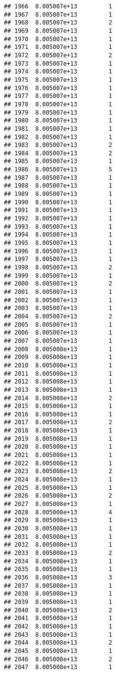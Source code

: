 \documentclass[
]{article}
\begin{document}
\begin{verbatim}
## 1966  8.005007e+13         1
## 1967  8.005007e+13         1
## 1968  8.005007e+13         2
## 1969  8.005007e+13         1
## 1970  8.005007e+13         1
## 1971  8.005007e+13         1
## 1972  8.005007e+13         2
## 1973  8.005007e+13         1
## 1974  8.005007e+13         1
## 1975  8.005007e+13         1
## 1976  8.005007e+13         1
## 1977  8.005007e+13         1
## 1978  8.005007e+13         1
## 1979  8.005007e+13         1
## 1980  8.005007e+13         1
## 1981  8.005007e+13         1
## 1982  8.005007e+13         1
## 1983  8.005007e+13         2
## 1984  8.005007e+13         2
## 1985  8.005007e+13         1
## 1986  8.005007e+13         5
## 1987  8.005007e+13         1
## 1988  8.005007e+13         1
## 1989  8.005007e+13         1
## 1990  8.005007e+13         1
## 1991  8.005007e+13         1
## 1992  8.005007e+13         1
## 1993  8.005007e+13         1
## 1994  8.005007e+13         1
## 1995  8.005007e+13         1
## 1996  8.005007e+13         1
## 1997  8.005007e+13         1
## 1998  8.005007e+13         2
## 1999  8.005007e+13         1
## 2000  8.005007e+13         2
## 2001  8.005007e+13         1
## 2002  8.005007e+13         1
## 2003  8.005007e+13         1
## 2004  8.005007e+13         2
## 2005  8.005007e+13         1
## 2006  8.005007e+13         1
## 2007  8.005007e+13         1
## 2008  8.005008e+13         1
## 2009  8.005008e+13         1
## 2010  8.005008e+13         1
## 2011  8.005008e+13         1
## 2012  8.005008e+13         1
## 2013  8.005008e+13         1
## 2014  8.005008e+13         2
## 2015  8.005008e+13         1
## 2016  8.005008e+13         1
## 2017  8.005008e+13         2
## 2018  8.005008e+13         1
## 2019  8.005008e+13         1
## 2020  8.005008e+13         1
## 2021  8.005008e+13         1
## 2022  8.005008e+13         1
## 2023  8.005008e+13         2
## 2024  8.005008e+13         1
## 2025  8.005008e+13         1
## 2026  8.005008e+13         2
## 2027  8.005008e+13         1
## 2028  8.005008e+13         4
## 2029  8.005008e+13         1
## 2030  8.005008e+13         1
## 2031  8.005008e+13         1
## 2032  8.005008e+13         1
## 2033  8.005008e+13         2
## 2034  8.005008e+13         1
## 2035  8.005008e+13         1
## 2036  8.005008e+13         3
## 2037  8.005008e+13         1
## 2038  8.005008e+13         1
## 2039  8.005008e+13         1
## 2040  8.005008e+13         2
## 2041  8.005008e+13         1
## 2042  8.005008e+13         1
## 2043  8.005008e+13         1
## 2044  8.005008e+13         2
## 2045  8.005008e+13         1
## 2046  8.005008e+13         2
## 2047  8.005008e+13         1

\end{verbatim}
\end{document}
